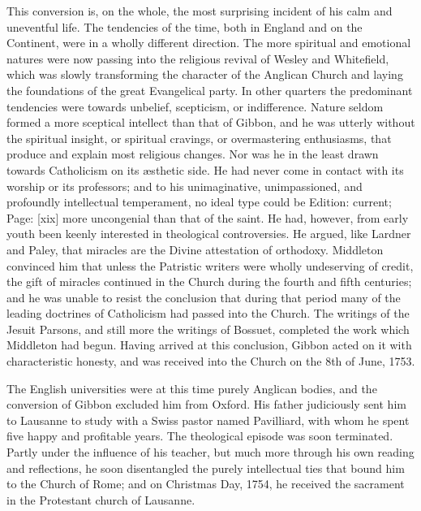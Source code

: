 This conversion is, on the whole, the most surprising incident of his calm and uneventful life. The tendencies of the time, both in England and on the Continent, were in a wholly different direction. The more spiritual and emotional natures were now passing into the religious revival of Wesley and Whitefield, which was slowly transforming the character of the Anglican Church and laying the foundations of the great Evangelical party. In other quarters the predominant tendencies were towards unbelief, scepticism, or indifference. Nature seldom formed a more sceptical intellect than that of Gibbon, and he was utterly without the spiritual insight, or spiritual cravings, or overmastering enthusiasms, that produce and explain most religious changes. Nor was he in the least drawn towards Catholicism on its æsthetic side. He had never come in contact with its worship or its professors; and to his unimaginative, unimpassioned, and profoundly intellectual temperament, no ideal type could be Edition: current; Page: [xix] more uncongenial than that of the saint. He had, however, from early youth been keenly interested in theological controversies. He argued, like Lardner and Paley, that miracles are the Divine attestation of orthodoxy. Middleton convinced him that unless the Patristic writers were wholly undeserving of credit, the gift of miracles continued in the Church during the fourth and fifth centuries; and he was unable to resist the conclusion that during that period many of the leading doctrines of Catholicism had passed into the Church. The writings of the Jesuit Parsons, and still more the writings of Bossuet, completed the work which Middleton had begun. Having arrived at this conclusion, Gibbon acted on it with characteristic honesty, and was received into the Church on the 8th of June, 1753.

The English universities were at this time purely Anglican bodies, and the conversion of Gibbon excluded him from Oxford. His father judiciously sent him to Lausanne to study with a Swiss pastor named Pavilliard, with whom he spent five happy and profitable years. The theological episode was soon terminated. Partly under the influence of his teacher, but much more through his own reading and reflections, he soon disentangled the purely intellectual ties that bound him to the Church of Rome; and on Christmas Day, 1754, he received the sacrament in the Protestant church of Lausanne.

